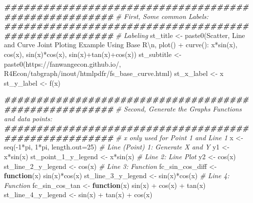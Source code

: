 \documentclass[
]{book}
\newenvironment{Shaded}{\begin{snugshade}}{\end{snugshade}}
\newcommand{\AttributeTok}[1]{\textcolor[rgb]{0.77,0.63,0.00}{#1}}
\newcommand{\CommentTok}[1]{\textcolor[rgb]{0.56,0.35,0.01}{\textit{#1}}}
\newcommand{\ControlFlowTok}[1]{\textcolor[rgb]{0.13,0.29,0.53}{\textbf{#1}}}
\newcommand{\DecValTok}[1]{\textcolor[rgb]{0.00,0.00,0.81}{#1}}
\newcommand{\DocumentationTok}[1]{\textcolor[rgb]{0.56,0.35,0.01}{\textbf{\textit{#1}}}}
\newcommand{\FunctionTok}[1]{\textcolor[rgb]{0.00,0.00,0.00}{#1}}
\newcommand{\NormalTok}[1]{#1}
\newcommand{\OtherTok}[1]{\textcolor[rgb]{0.56,0.35,0.01}{#1}}
\newcommand{\SpecialCharTok}[1]{\textcolor[rgb]{0.00,0.00,0.00}{#1}}
\newcommand{\StringTok}[1]{\textcolor[rgb]{0.31,0.60,0.02}{#1}}
\begin{document}
\begin{Shaded}
\begin{Highlighting}[]
\DocumentationTok{\#\#\#\#\#\#\#\#\#\#\#\#\#\#\#\#\#\#\#\#\#\#\#\#\#\#\#\#\#\#\#\#\#\#\#\#\#\#\#\#\#\#\#\#\#\#\#\#\#\#\#\#\#\#\#}
\CommentTok{\# First, Some common Labels:}
\DocumentationTok{\#\#\#\#\#\#\#\#\#\#\#\#\#\#\#\#\#\#\#\#\#\#\#\#\#\#\#\#\#\#\#\#\#\#\#\#\#\#\#\#\#\#\#\#\#\#\#\#\#\#\#\#\#\#\#}
\CommentTok{\# Labeling}
\NormalTok{st\_title }\OtherTok{\textless{}{-}} \FunctionTok{paste0}\NormalTok{(}\StringTok{\textquotesingle{}Scatter, Line and Curve Joint Ploting Example Using Base R}\SpecialCharTok{\textbackslash{}n}\StringTok{\textquotesingle{}}\NormalTok{,}
                   \StringTok{\textquotesingle{}plot() + curve(): x*sin(x), cos(x), sin(x)*cos(x), sin(x)+tan(x)+cos(x)\textquotesingle{}}\NormalTok{)}
\NormalTok{st\_subtitle }\OtherTok{\textless{}{-}} \FunctionTok{paste0}\NormalTok{(}\StringTok{\textquotesingle{}https://fanwangecon.github.io/\textquotesingle{}}\NormalTok{,}
                      \StringTok{\textquotesingle{}R4Econ/tabgraph/inout/htmlpdfr/fs\_base\_curve.html\textquotesingle{}}\NormalTok{)}
\NormalTok{st\_x\_label }\OtherTok{\textless{}{-}} \StringTok{\textquotesingle{}x\textquotesingle{}}
\NormalTok{st\_y\_label }\OtherTok{\textless{}{-}} \StringTok{\textquotesingle{}f(x)\textquotesingle{}}

\DocumentationTok{\#\#\#\#\#\#\#\#\#\#\#\#\#\#\#\#\#\#\#\#\#\#\#\#\#\#\#\#\#\#\#\#\#\#\#\#\#\#\#\#\#\#\#\#\#\#\#\#\#\#\#\#\#\#\#}
\CommentTok{\# Second, Generate the Graphs Functions and data points:}
\DocumentationTok{\#\#\#\#\#\#\#\#\#\#\#\#\#\#\#\#\#\#\#\#\#\#\#\#\#\#\#\#\#\#\#\#\#\#\#\#\#\#\#\#\#\#\#\#\#\#\#\#\#\#\#\#\#\#\#}
\CommentTok{\# x only used for Point 1 and Line 1}
\NormalTok{x }\OtherTok{\textless{}{-}} \FunctionTok{seq}\NormalTok{(}\SpecialCharTok{{-}}\DecValTok{1}\SpecialCharTok{*}\NormalTok{pi, }\DecValTok{1}\SpecialCharTok{*}\NormalTok{pi, }\AttributeTok{length.out=}\DecValTok{25}\NormalTok{)}
\CommentTok{\# Line (Point) 1: Generate X and Y}
\NormalTok{y1 }\OtherTok{\textless{}{-}}\NormalTok{ x}\SpecialCharTok{*}\FunctionTok{sin}\NormalTok{(x)}
\NormalTok{st\_point\_1\_y\_legend }\OtherTok{\textless{}{-}} \StringTok{\textquotesingle{}x*sin(x)\textquotesingle{}}
\CommentTok{\# Line 2: Line Plot}
\NormalTok{y2 }\OtherTok{\textless{}{-}} \FunctionTok{cos}\NormalTok{(x)}
\NormalTok{st\_line\_2\_y\_legend }\OtherTok{\textless{}{-}} \StringTok{\textquotesingle{}cos(x)\textquotesingle{}}
\CommentTok{\# Line 3: Function}
\NormalTok{fc\_sin\_cos\_diff }\OtherTok{\textless{}{-}} \ControlFlowTok{function}\NormalTok{(x) }\FunctionTok{sin}\NormalTok{(x)}\SpecialCharTok{*}\FunctionTok{cos}\NormalTok{(x)}
\NormalTok{st\_line\_3\_y\_legend }\OtherTok{\textless{}{-}} \StringTok{\textquotesingle{}sin(x)*cos(x)\textquotesingle{}}
\CommentTok{\# Line 4: Function}
\NormalTok{fc\_sin\_cos\_tan }\OtherTok{\textless{}{-}} \ControlFlowTok{function}\NormalTok{(x) }\FunctionTok{sin}\NormalTok{(x) }\SpecialCharTok{+} \FunctionTok{cos}\NormalTok{(x) }\SpecialCharTok{+} \FunctionTok{tan}\NormalTok{(x)}
\NormalTok{st\_line\_4\_y\_legend }\OtherTok{\textless{}{-}} \StringTok{\textquotesingle{}sin(x) + tan(x) + cos(x)\textquotesingle{}}


\end{Highlighting}
\end{Shaded}
\end{document}
